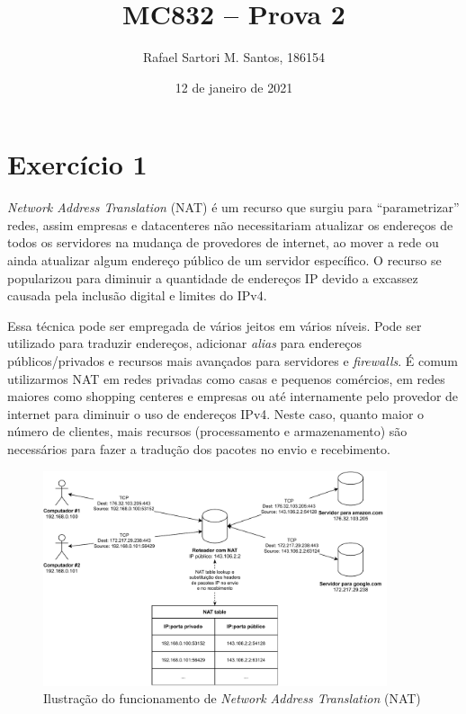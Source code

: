 \documentclass[brazilian,a4paper]{article}
\title{MC832 -- Prova 2}
\author{Rafael Sartori M. Santos, 186154}
\date{12 de janeiro de 2021}
\begin{document}
\maketitle


\section*{Exercício 1}

\textit{Network Address Translation} (NAT) é um recurso que surgiu para ``parametrizar'' redes, assim empresas e datacenteres não necessitariam atualizar os endereços de todos os servidores na mudança de provedores de internet, ao mover a rede ou ainda atualizar algum endereço público de um servidor específico. O recurso se popularizou para diminuir a quantidade de endereços IP devido a excassez causada pela inclusão digital e limites do IPv4.

Essa técnica pode ser empregada de vários jeitos em vários níveis. Pode ser utilizado para traduzir endereços, adicionar \textit{alias} para endereços públicos/privados e recursos mais avançados para servidores e \textit{firewalls}. É comum utilizarmos NAT em redes privadas como casas e pequenos comércios, em redes maiores como shopping centeres e empresas ou até internamente pelo provedor de internet para diminuir o uso de endereços IPv4. Neste caso, quanto maior o número de clientes, mais recursos (processamento e armazenamento) são necessários para fazer a tradução dos pacotes no envio e recebimento.

\begin{figure}[h!]
    \centering
    \includegraphics[width=0.9\textwidth]{prova2-nat.pdf}
    \caption{Ilustração do funcionamento de \textit{Network Address Translation} (NAT)}
    \label{fig-nat}
\end{figure}
\end{document}
